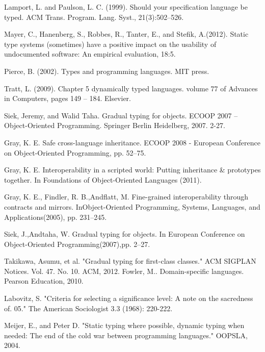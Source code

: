 \documentclass[]{sigplanconf}
\begin{document}
\begin{thebibliography}{}
Lamport, L. and Paulson, L. C. (1999). Should your specification language be typed. ACM Trans. Program. Lang. Syst., 21(3):502–526.

Mayer, C., Hanenberg, S., Robbes, R., Tanter, E., and Stefik, A.(2012). Static type systems (sometimes) have a positive impact on the usability of undocumented software: An empirical evaluation,  18:5.

Pierce, B. (2002). Types and programming languages. MIT press.

Tratt, L. (2009). Chapter 5 dynamically typed languages. volume 77 of Advances in Computers, pages 149 – 184. Elsevier.

Siek, Jeremy, and Walid Taha. Gradual typing for objects. ECOOP 2007 – Object-Oriented Programming. Springer Berlin Heidelberg, 2007. 2-27.

Gray, K. E. Safe cross-language inheritance. ECOOP 2008 - European Conference on Object-Oriented Programming, pp. 52–75.

Gray, K. E. Interoperability in a scripted world: Putting inheritance \& prototypes together. In Foundations of Object-Oriented Languages (2011).

Gray, K. E., Findler, R. B.,Andflatt, M. Fine-grained interoperability through contracts and mirrors. InObject-Oriented Programming, Systems, Languages, and Applications(2005), pp. 231–245.

Siek, J.,Andtaha, W. Gradual typing for objects. In European Conference on Object-Oriented Programming(2007),pp. 2–27.

Takikawa, Asumu, et al. "Gradual typing for first-class classes." ACM SIGPLAN Notices. Vol. 47. No. 10. ACM, 2012.
Fowler, M.. Domain-specific languages. Pearson Education, 2010.

Labovitz, S. "Criteria for selecting a significance level: A note on the sacredness of. 05." The American Sociologist 3.3 (1968): 220-222.

Meijer, E., and Peter D. "Static typing where possible, dynamic typing when needed: The end of the cold war between programming languages." OOPSLA, 2004.


\end{thebibliography}
\end{document}
